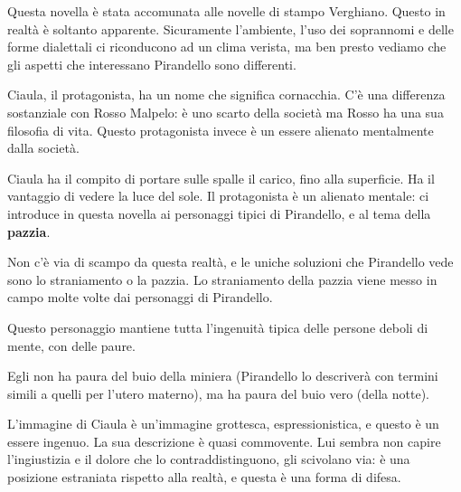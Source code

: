 \documentclass[a4paper, twoside, titlepage]{book}
\begin{document}
Questa novella è stata accomunata alle novelle di stampo Verghiano.
Questo in realtà è soltanto apparente. Sicuramente l'ambiente, l'uso dei soprannomi e delle forme dialettali ci riconducono ad un clima verista, ma ben presto vediamo che gli aspetti che interessano Pirandello sono differenti.

Ciaula, il protagonista, ha un nome che significa cornacchia. C'è una differenza sostanziale con Rosso Malpelo: è uno scarto della società ma Rosso ha una sua filosofia di vita. Questo protagonista invece è un essere alienato mentalmente dalla società.

Ciaula ha il compito di portare sulle spalle il carico, fino alla superficie. Ha il vantaggio di vedere la luce del sole.
Il protagonista è un alienato mentale: ci introduce in questa novella ai personaggi tipici di Pirandello, e al tema della \textbf{pazzia}.

Non c'è via di scampo da questa realtà, e le uniche soluzioni che Pirandello vede sono lo straniamento o la pazzia. Lo straniamento della pazzia viene messo in campo molte volte dai personaggi di Pirandello.

Questo personaggio mantiene tutta l'ingenuità tipica delle persone deboli di mente, con delle paure.

Egli non ha paura del buio della miniera (Pirandello lo descriverà con termini simili a quelli per l'utero materno), ma ha paura del buio vero (della notte).

L'immagine di Ciaula è un'immagine grottesca, espressionistica, e questo è un essere ingenuo.
La sua descrizione è quasi commovente. Lui sembra non capire l'ingiustizia e il dolore che lo contraddistinguono, gli scivolano via: è una posizione estraniata rispetto alla realtà, e questa è una forma di difesa.
\end{document}
